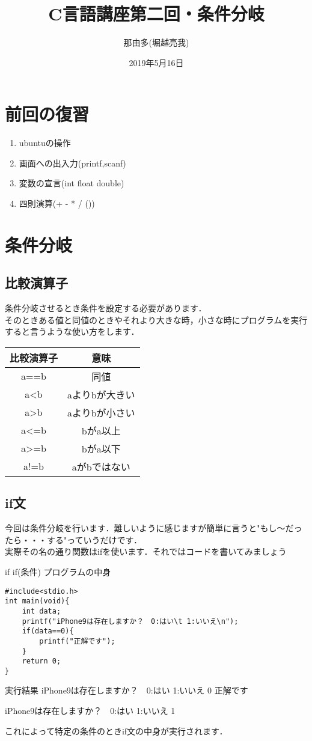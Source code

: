 \documentclass[a4j,titlepage,dvipdfmx]{jsarticle}   %
\title{C言語講座第二回・条件分岐}
\author{那由多(堀越亮我)}
\date{2019年5月16日}
\begin{document}
\maketitle
\section{前回の復習}
\begin{enumerate}
\item ubuntuの操作
\item 画面への出入力(printf,scanf)
\item 変数の宣言(int float double)
\item 四則演算(+ - * / ())
\end{enumerate}
\section{条件分岐}
\subsection{比較演算子}
条件分岐させるとき条件を設定する必要があります．\\
そのときある値と同値のときやそれより大きな時，小さな時にプログラムを実行すると言うような使い方をします．
\begin{table}[h]
\begin{tabular}{|c|c|}
\hline
比較演算子 & 意味 \\ \hline
a==b & 同値 \\ \hline
a\textless{}b & aよりbが大きい \\ \hline
a\textgreater{}b & aよりbが小さい \\ \hline
a\textless{}=b & bがa以上 \\ \hline
a\textgreater{}=b & bがa以下 \\ \hline
a!=b & aがbではない \\ \hline
\end{tabular}
\end{table}
\subsection{if文}
今回は条件分岐を行います．難しいように感じますが簡単に言うと"もし〜だったら・・・する"っていうだけです．\\
実際その名の通り関数はifを使います．それではコードを書いてみましょう
\begin{itembox}{if}
if(条件){
	プログラムの中身
}
\end{itembox}
\begin{lstlisting}
#include<stdio.h>
int main(void){
	int data;
    printf("iPhone9は存在しますか？　0:はい\t 1:いいえ\n");
    if(data==0){
    	printf("正解です");
    }
    return 0;
}
\end{lstlisting}
\begin{itembox}{実行結果}
iPhone9は存在しますか？　0:はい      1:いいえ
0
正解です

iPhone9は存在しますか？　0:はい      1:いいえ
1
\end{itembox}
これによって特定の条件のときif文の中身が実行されます．
\end{document}
